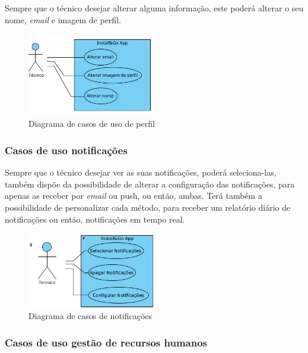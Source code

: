 Sempre que o técnico desejar alterar alguma informação, este poderá alterar o seu nome, \textit{email} e imagem de perfil.

\begin{figure}[htb]
    \centering
    
    \includegraphics[width=0.5\textwidth]{images/diagramas/casos_de_uso/use_case_perfil.png}
    \caption{Diagrama de casos de uso de perfil}
    \label{fig:17}
\end{figure}

\newpage

\subsubsection{Casos de uso notificações}

Sempre que o técnico desejar ver as suas notificações, poderá seleciona-las, também dispõe da possibilidade de alterar a configuração das notificações, para apenas as receber por \textit{email} ou push, ou então, ambas. Terá também a possibilidade de personalizar cada método, para receber um relatório diário de notificações ou então, notificações em tempo real.

\begin{figure}[htb]
    \centering
    \includegraphics[width=0.5\textwidth]{images/diagramas/casos_de_uso/use_case_notificacoes.png}
    \caption{Diagrama de casos de notificações}
    \label{fig:18}
\end{figure}

\subsubsection{Casos de uso gestão de recursos humanos}

